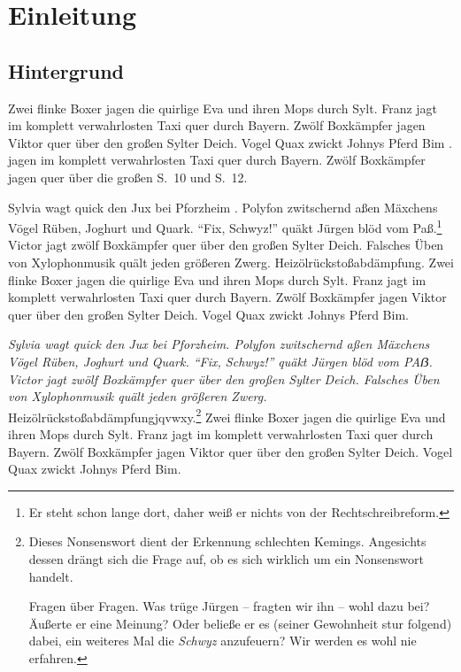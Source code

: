 \hypertarget{einleitung}{%
\section{Einleitung}\label{einleitung}}

\hypertarget{hintergrund}{%
\subsection{Hintergrund}\label{hintergrund}}

Zwei \AbbreVidR flinke Boxer jagen die quirlige Eva und \AbbreVzB
ihren Mops durch Sylt. Franz jagt im komplett verwahrlosten Taxi
quer durch Bayern. Zwölf Boxkämpfer jagen Viktor quer über den
großen Sylter Deich. Vogel Quax zwickt Johnys Pferd Bim
\autocite[214-216]{Samuel_StudiesMachine_1959}.
\textcite[564\psqq]{Nocedal_NumericalOptimization_2006} jagen im
komplett verwahrlosten Taxi quer durch Bayern. Zwölf Boxkämpfer
jagen \textcite{DeSmedt_PatternPython_2012} quer über die großen
S.~10 und S.~12.

Sylvia wagt quick den Jux bei Pforzheim
\autocite[vgl.][21\psqq]{VanderWalt_NumPyArray_2011}. Polyfon
zwitschernd aßen Mäxchens Vögel Rüben, Joghurt und Quark.
\enquote{Fix, Schwyz!} quäkt Jürgen blöd vom Paß.\footnote{Er steht
  schon lange dort, daher weiß er nichts von der Rechtschreibreform.}
Victor jagt zwölf Boxkämpfer quer über den großen Sylter Deich.
Falsches Üben von Xylophonmusik quält jeden größeren Zwerg.
Heizölrückstoßabdämpfung. Zwei flinke Boxer jagen die quirlige Eva
und ihren Mops durch Sylt. Franz jagt im komplett verwahrlosten Taxi
quer durch Bayern. Zwölf Boxkämpfer jagen Viktor quer über den
großen Sylter Deich. Vogel Quax zwickt Johnys Pferd Bim.

\emph{Sylvia wagt quick den Jux bei Pforzheim. Polyfon zwitschernd
aßen Mäxchens Vögel Rüben, Joghurt und Quark. \enquote{Fix, Schwyz!}
quäkt Jürgen blöd vom PAẞ. Victor jagt zwölf Boxkämpfer quer über
den großen Sylter Deich. Falsches Üben von Xylophonmusik quält jeden
größeren Zwerg.} Heizölrückstoßabdämpfungjqvwxy.\footnote{Dieses
  Nonsenswort dient der Erkennung schlechten Kemings. Angesichts
  dessen drängt sich die Frage auf, ob es sich wirklich um ein
  Nonsenswort handelt.

  Fragen über Fragen. Was trüge Jürgen -- fragten wir ihn -- wohl
  dazu bei? Äußerte er eine Meinung? Oder beließe er es (seiner
  Gewohnheit stur folgend) dabei, ein weiteres Mal die \emph{Schwyz}
  anzufeuern? Wir werden es wohl nie erfahren.} Zwei flinke Boxer
jagen die quirlige Eva und ihren Mops durch Sylt. Franz jagt im
komplett verwahrlosten Taxi quer durch Bayern. Zwölf Boxkämpfer
jagen Viktor quer über den großen Sylter Deich. Vogel Quax zwickt
Johnys Pferd Bim.


